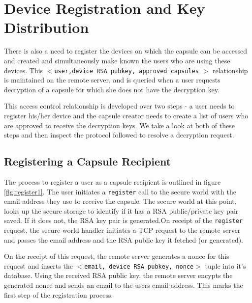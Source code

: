 \chapter{Device Registration and Key Distribution}
\label{ch:device_key_reg}
There is also a need to register the devices on which the capsule can be
accessed and created and simultaneously make known the users who are using these
devices. This $<$\texttt{user,device RSA pubkey, approved capsules} $>$ relationship is
maintained on the remote server, and is queried when a user
requests decryption of a capsule for which she does not have the decryption key.

This access control relationship is developed over two steps - a user needs to register
his/her device and the capsule creator needs to create a list of users who are
approved to receive the decryption keys. We take a look at both of these steps
and then inspect the protocol followed to resolve a decryption request.

\section{Registering a Capsule Recipient}
The process to register a user as a capsule recipient is outlined in figure
\ref{fig:register1}. The user initiates a \texttt{register} call to the secure
world with the email address they use to receive the capsule. The secure world
at this point, looks up the secure storage to identify if it has a RSA
public/private key pair saved. If it does not, the RSA key pair is generated.On
receipt of the \texttt{register} request, the secure world handler initiates a
TCP request to the remote server and passes the email address and the RSA public
key it fetched (or generated). 

On the receipt of this request, the remote server generates a nonce for this
request and inserts the $<$\texttt{email, device RSA pubkey, nonce}$>$ tuple
into it's database. Using the received RSA public key, the remote server encypts
the generated nonce and sends an email to the users email address. This marks
the first step of the registration process.



